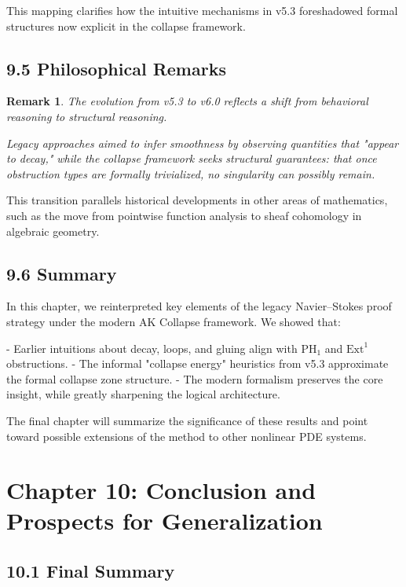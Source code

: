\documentclass[11pt]{article}
\newtheorem{remark}[theorem]{Remark}
\begin{document}
This mapping clarifies how the intuitive mechanisms in v5.3 foreshadowed formal structures now explicit in the collapse framework.

\subsection{9.5 Philosophical Remarks}

\begin{remark}
The evolution from v5.3 to v6.0 reflects a shift from \emph{behavioral} reasoning to \emph{structural} reasoning.

Legacy approaches aimed to infer smoothness by observing quantities that "appear to decay,"  
while the collapse framework seeks structural guarantees: that once obstruction types are formally trivialized,  
no singularity can possibly remain.
\end{remark}

This transition parallels historical developments in other areas of mathematics,  
such as the move from pointwise function analysis to sheaf cohomology in algebraic geometry.

\subsection{9.6 Summary}

In this chapter, we reinterpreted key elements of the legacy Navier–Stokes proof strategy under the modern AK Collapse framework.  
We showed that:

- Earlier intuitions about decay, loops, and gluing align with \( \mathrm{PH}_1 \) and \( \mathrm{Ext}^1 \) obstructions.
- The informal "collapse energy" heuristics from v5.3 approximate the formal collapse zone structure.
- The modern formalism preserves the core insight, while greatly sharpening the logical architecture.

The final chapter will summarize the significance of these results and point toward possible extensions of the method to other nonlinear PDE systems.



\section{Chapter 10: Conclusion and Prospects for Generalization}

\subsection{10.1 Final Summary}
\end{document}

